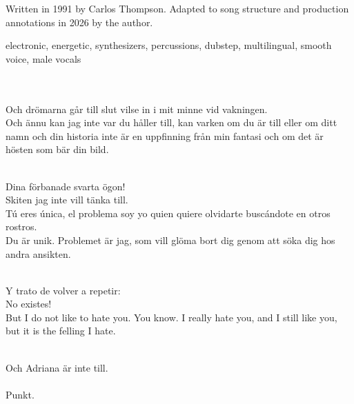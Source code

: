 

\begin{notes}
Written in 1991 by Carlos Thompson. Adapted to song structure and production annotations in 2026 by the author.
\end{notes}
\begin{style}
electronic, energetic, synthesizers, percussions, dubstep, multilingual, smooth voice, male vocals
\end{style}
\begin{lyrics}

\\
\\
Och drömarna går till slut vilse in i mit minne vid vakningen.\\
Och ännu kan jag inte var du håller till, kan varken om du är till eller om ditt namn och din historia inte är en uppfinning från min fantasi och om det är hösten som bär din bild.


\\
Dina förbanade svarta ögon!\\
Skiten jag inte vill tänka till.\\
Tú eres única, el problema soy yo quien quiere olvidarte buscándote en otros rostros. 
\\
Du är unik.  Problemet är jag, som vill glöma bort dig genom att söka dig hos andra ansikten.


\\
Y trato de volver a repetir:\\
No existes!\\
But I do not like to hate you.  You know.  I really hate you, and I still like you, but it is the felling I hate.


\\
Och Adriana är inte till.\\
\\
Punkt.
\end{lyrics}

